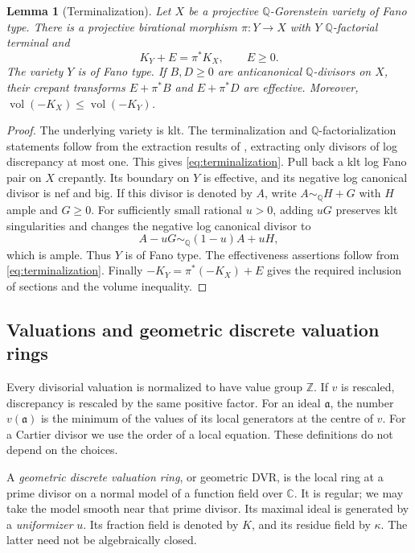 \documentclass[11pt,reqno]{amsart}
\numberwithin{equation}{section}
\newtheorem{lemma}[theorem]{Lemma}
\theoremstyle{definition}
\theoremstyle{remark}
\newcommand{\Q}{\mathbb Q}
\newcommand{\C}{\mathbb C}
\newcommand{\Z}{\mathbb Z}
\newcommand{\simq}{\sim_{\Q}}
\newcommand{\vol}{\operatorname{vol}}
\newcommand{\ba}{\mathfrak a}
\begin{document}
\begin{lemma}[Terminalization]\label{lem:terminalization}
Let $X$ be a projective $\Q$-Gorenstein variety of Fano type. There is a projective birational morphism $\pi:Y\to X$ with $Y$ $\Q$-factorial terminal and
\begin{equation}\label{eq:terminalization}
 K_Y+E=\pi^*K_X,\qquad E\ge0.
\end{equation}
The variety $Y$ is of Fano type. If $B,D\ge0$ are anticanonical $\Q$-divisors on $X$, their crepant transforms $E+\pi^*B$ and $E+\pi^*D$ are effective. Moreover, $\vol(-K_X)\le\vol(-K_Y)$.
\end{lemma}
\begin{proof}
The underlying variety is klt. The terminalization and $\Q$-factorialization statements follow from the extraction results of \cite[Corollary~1.4.3]{BCHM}, extracting only divisors of log discrepancy at most one. This gives \eqref{eq:terminalization}. Pull back a klt log Fano pair on $X$ crepantly. Its boundary on $Y$ is effective, and its negative log canonical divisor is nef and big. If this divisor is denoted by $A$, write $A\simq H+G$ with $H$ ample and $G\ge0$. For sufficiently small rational $u>0$, adding $uG$ preserves klt singularities and changes the negative log canonical divisor to
\[
 A-uG\simq(1-u)A+uH,
\]
which is ample. Thus $Y$ is of Fano type. The effectiveness assertions follow from \eqref{eq:terminalization}. Finally $-K_Y=\pi^*(-K_X)+E$ gives the required inclusion of sections and the volume inequality.
\end{proof}

\subsection{Valuations and geometric discrete valuation rings}
Every divisorial valuation is normalized to have value group $\Z$. If $v$ is rescaled, discrepancy is rescaled by the same positive factor. For an ideal $\ba$, the number $v(\ba)$ is the minimum of the values of its local generators at the centre of $v$. For a Cartier divisor we use the order of a local equation. These definitions do not depend on the choices.

A \emph{geometric discrete valuation ring}, or geometric DVR, is the local ring at a prime divisor on a normal model of a function field over $\C$. It is regular; we may take the model smooth near that prime divisor. Its maximal ideal is generated by a \emph{uniformizer} $u$. Its fraction field is denoted by $K$, and its residue field by $\kappa$. The latter need not be algebraically closed.
\end{document}
